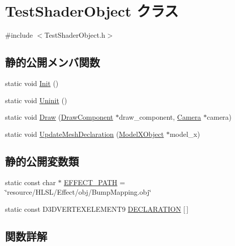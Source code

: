 \hypertarget{class_test_shader_object}{}\section{Test\+Shader\+Object クラス}
\label{class_test_shader_object}


{\ttfamily \#include $<$Test\+Shader\+Object.\+h$>$}

\subsection*{静的公開メンバ関数}
\begin{DoxyCompactItemize}
\item 
static void \mbox{\hyperlink{class_test_shader_object_aef19941d0cdc9ffa8a62455a6f48a5a2}{Init}} ()
\item 
static void \mbox{\hyperlink{class_test_shader_object_a1f89d336770c5ea0c9f23a7df79fe00b}{Uninit}} ()
\item 
static void \mbox{\hyperlink{class_test_shader_object_a0658e9a699fe58b66f70ef0c867b7f2e}{Draw}} (\mbox{\hyperlink{class_draw_component}{Draw\+Component}} $\ast$draw\+\_\+component, \mbox{\hyperlink{class_camera}{Camera}} $\ast$camera)
\item 
static void \mbox{\hyperlink{class_test_shader_object_a7268e145f2cd54f8ef4df65c5a44aecf}{Update\+Mesh\+Declaration}} (\mbox{\hyperlink{class_model_x_object}{Model\+X\+Object}} $\ast$model\+\_\+x)
\end{DoxyCompactItemize}
\subsection*{静的公開変数類}
\begin{DoxyCompactItemize}
\item 
static const char $\ast$ \mbox{\hyperlink{class_test_shader_object_a12ffb8becf8fc3152346435a243ae072}{E\+F\+F\+E\+C\+T\+\_\+\+P\+A\+TH}} = \char`\"{}resource/H\+L\+SL/Effect/obj/Bump\+Mapping.\+obj\char`\"{}
\item 
static const D3\+D\+V\+E\+R\+T\+E\+X\+E\+L\+E\+M\+E\+N\+T9 \mbox{\hyperlink{class_test_shader_object_a1ed43afd7dd1b419fc038128ac31a122}{D\+E\+C\+L\+A\+R\+A\+T\+I\+ON}} \mbox{[}$\,$\mbox{]}
\end{DoxyCompactItemize}


\subsection{関数詳解}
\mbox{\label{class_test_shader_object_a0658e9a699fe58b66f70ef0c867b7f2e}} 
